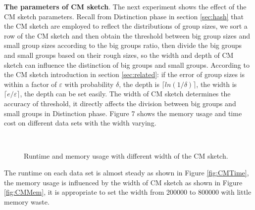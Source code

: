 \textbf{The parameters of CM sketch}. The next experiment shows the effect of the CM sketch parameters. Recall from Distinction phase in section \ref{sec:hash} that the CM sketch are employed to reflect the distributions of group sizes, we sort a row of the CM sketch and then obtain the threshold between big group sizes and small group sizes according to the big groups ratio, then divide the big groups and small groups based on their rough sizes, so the width and depth of CM sketch can influence the distinction of big groups and small groups. According to the CM sketch introduction in section \ref{sec:related}: if the error of group sizes is within a factor of $ \varepsilon $ with probability $ \delta$, the depth is $\lceil ln(1/\delta)\rceil $, the width is $\lceil e/\varepsilon\rceil $, the depth can be set easily. The width of CM sketch determines the accuracy of threshold, it directly affects the division between big groups and small groups in Distinction phase. Figure 7 shows the memory usage and time cost on different data sets with the width varying.
\begin{figure}[htbp]
	\label{fig: CMPara}
       \hspace{0.23cm}
    \\    
	\caption{Runtime and memory usage with different width of the CM sketch.}	
	
\end{figure}

The runtime on each data set is almost steady as shown in Figure \ref{fig:CMTime}, the memory usage is influenced by the width of CM sketch as shown in Figure \ref{fig:CMMem}, it is appropriate to set the width from 200000 to 800000 with little memory waste.   

